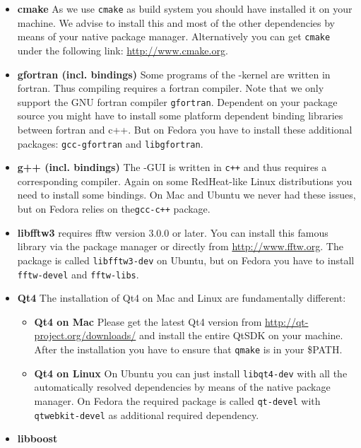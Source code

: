 \begin{itemize}
	\item \textbf{cmake} As we use \texttt{cmake} as build system you should have installed it on your machine. We advise to install this and most of the other dependencies by means of your native package manager. Alternatively you can get \texttt{cmake} under the following link: \url{http://www.cmake.org}.
	 
	\item \textbf{gfortran (incl. bindings)} Some programs of the {\twodx}-kernel are written in fortran. Thus compiling {\twodx} requires a fortran compiler. Note that we only support the GNU fortran compiler \texttt{gfortran}. Dependent on your package source you might have to install some platform dependent binding libraries between fortran and c++. But on Fedora you have to install these additional packages: \texttt{gcc-gfortran} and \texttt{libgfortran}.  
	
	\item \textbf{g++ (incl. bindings)} The {\twodx}-GUI is written in \texttt{c++} and thus requires a corresponding compiler. Again on some RedHeat-like Linux distributions you need to install some bindings. On Mac and Ubuntu we never had these issues, but on Fedora {\twodx} relies on the\texttt{gcc-c++} package.
	
	\item \textbf{libfftw3} {\twodx} requires fftw version 3.0.0 or later. You can install this famous library via the package manager or directly from \url{http://www.fftw.org}. The package is called \texttt{libfftw3-dev} on Ubuntu, but on Fedora you have to install \texttt{fftw-devel} and \texttt{fftw-libs}.

	\item \textbf{Qt4} The installation of Qt4 on Mac and Linux are fundamentally different:
		\begin{itemize}
			\item \textbf{Qt4 on Mac} Please get the latest Qt4 version from \url{http://qt-project.org/downloads/} and install the entire QtSDK on your machine. After the installation you have to ensure that \texttt{qmake} is in your \$PATH. 
			\item \textbf{Qt4 on Linux} On Ubuntu you can just install \texttt{libqt4-dev} with all the automatically resolved dependencies by means of the native package manager. On Fedora the required package is called \texttt{qt-devel} with \texttt{qtwebkit-devel} as additional required dependency.
		\end{itemize}
		
	\item \textbf{libboost}
\end{itemize}

